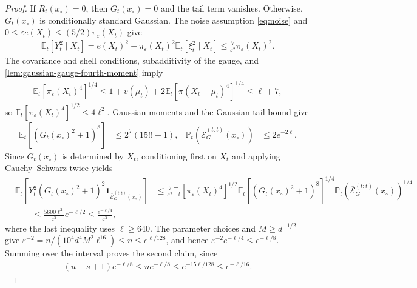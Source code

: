 \documentclass{article}
\newcommand{\E}{\mathbb E}
\newcommand{\Pp}{\mathbb P}
\newcommand{\1}{\mathbf 1}
\newcommand{\eps}{\varepsilon}
\begin{document}
\begin{proof}
    If $R_t(x_{\circ})=0$, then $G_t(x_{\circ})=0$ and the tail term vanishes.
    Otherwise, $G_t(x_{\circ})$ is conditionally standard Gaussian.
    The noise assumption \eqref{eq:noise} and
    $0\leq\eps e(X_t)\leq(5/2)\pi_\eps(X_t)$ give
    \begin{align}
        \E_t[Y_t^2\mid X_t]
        =e(X_t)^2+\pi_\eps(X_t)^2\E_t[\xi_t^2\mid X_t]
        \leq\frac7{\eps^2}\pi_\eps(X_t)^2.
    \end{align}
    The covariance and shell conditions, subadditivity of the gauge,
    and \cref{lem:gaussian-gauge-fourth-moment} imply
    \begin{align}
        \E_t[\pi_\eps(X_t)^4]^{1/4}
        \leq1+v(\mu_t)+2\E_t[\pi(X_t-\mu_t)^4]^{1/4}
        \leq\ell+7,
    \end{align}
    so $\E_t[\pi_\eps(X_t)^4]^{1/2}\leq4\ell^2$.
    Gaussian moments and the Gaussian tail bound give
    \begin{align}
        \E_t[(G_t(x_{\circ})^2+1)^8]
         & \leq2^7(15!!+1),
         &
        \Pp_t\left(\overline{\mathcal E}_G^{(t:t)}(x_{\circ})\right)
         & \leq2e^{-2\ell}.
    \end{align}
    Since $G_t(x_{\circ})$ is determined by $X_t$, conditioning first on
    $X_t$ and applying Cauchy--Schwarz twice yields
    \begin{align}
         & \E_t\left[Y_t^2(G_t(x_{\circ})^2+1)^2
        \1_{\overline{\mathcal E}_G^{(t:t)}(x_{\circ})}\right]
         & \leq\frac7{\eps^2}
        \E_t[\pi_\eps(X_t)^4]^{1/2}
        \E_t[(G_t(x_{\circ})^2+1)^8]^{1/4}
        \Pp_t\left(\overline{\mathcal E}_G^{(t:t)}(x_{\circ})\right)^{1/4}
        \nonumber                                         \\
         & \qquad\leq\frac{5600\ell^2}{\eps^2}e^{-\ell/2}
        \leq\frac{e^{-\ell/4}}{\eps^2},
    \end{align}
    where the last inequality uses $\ell\geq640$.
    The parameter choices and $M\geq d^{-1/2}$ give
    $\eps^{-2}=n/(10^4d^4M^2\ell^{16})\leq n\leq e^{\ell/128}$,
    and hence $\eps^{-2}e^{-\ell/4}\leq e^{-\ell/8}$.
    Summing over the interval proves the second claim, since
    \begin{align}
        (u-s+1)e^{-\ell/8}
        \leq ne^{-\ell/8}
        \leq e^{-15\ell/128}
        \leq e^{-\ell/16}.
    \end{align}
\end{proof}
\end{document}

